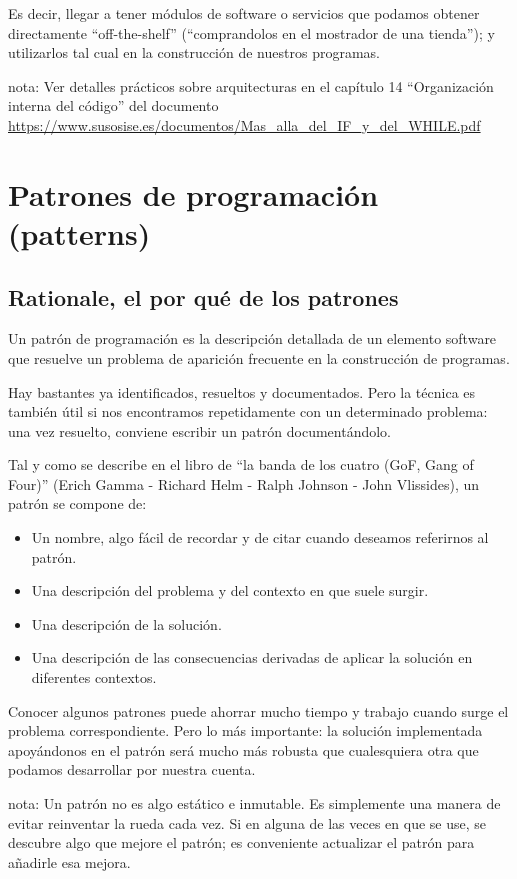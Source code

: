 \documentclass[spanish,12pt,a4paper,final,oneside]{book}
\begin{document}
Es decir, llegar a tener módulos de software o servicios que podamos obtener directamente ``off-the-shelf'' (``comprandolos en el mostrador de una tienda''); y utilizarlos tal cual en la construcción de nuestros programas.

nota: \footnotesize{Ver detalles prácticos sobre arquitecturas en el capítulo 14 ``Organización interna del código'' del documento \url{https://www.susosise.es/documentos/Mas_alla_del_IF_y_del_WHILE.pdf}}




\chapter{Patrones de programación (patterns)}
\section{Rationale, el por qué de los patrones}
Un patrón de programación es la descripción detallada de un elemento software que resuelve un problema de  aparición frecuente en la construcción de programas. 

Hay bastantes ya identificados, resueltos y documentados. Pero la técnica es también útil si nos encontramos repetidamente con un determinado problema: una vez resuelto, conviene escribir un patrón documentándolo.

Tal y como se describe en el libro de ``la banda de los cuatro (GoF, Gang of Four)'' (Erich Gamma - Richard Helm - Ralph Johnson - John Vlissides), un patrón se compone de:
\begin{itemize}
\item Un nombre, algo fácil de recordar y de citar cuando deseamos referirnos al patrón.
\item Una descripción del problema y del contexto en que suele surgir.
\item Una descripción de la solución.
\item Una descripción de las consecuencias derivadas de aplicar la solución en diferentes contextos.
\end{itemize}

Conocer algunos patrones puede ahorrar mucho tiempo y trabajo cuando surge el problema correspondiente. Pero lo más importante: la solución implementada apoyándonos en el patrón será mucho más robusta que cualesquiera otra que podamos desarrollar por nuestra cuenta.

nota: Un patrón no es algo estático e inmutable. Es simplemente una manera de evitar reinventar la rueda cada vez. Si en alguna de las veces en que se use, se descubre algo que mejore el patrón; es conveniente actualizar el patrón para añadirle esa mejora.
\end{document}
